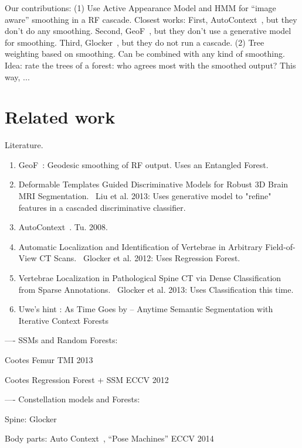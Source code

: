 \documentclass[10pt,twocolumn,letterpaper]{article}
\begin{document}
Our contributions: 
%
(1) Use Active Appearance Model and HMM for "`image aware"' smoothing in a RF cascade. 
Closest works: 
First, AutoContext~\cite{AutoContext2008}, but they don't do any smoothing. 
Second, GeoF~\cite{GeoForests2013}, but they don't use a generative model for smoothing. 
Third, Glocker~\cite{Glocker2013}, but they do not run a cascade. 
%
(2) Tree weighting based on smoothing. Can be combined with any kind of smoothing. Idea: rate the trees of a forest: who agrees most with the smoothed output? This way, ...
%

\section{Related work}

Literature.
\begin{enumerate}
\item GeoF~\cite{GeoForests2013}: Geodesic smoothing of RF output.  Uses an Entangled Forest.
\item Deformable Templates Guided Discriminative Models for Robust 3D Brain MRI Segmentation.~\cite{BrainSeg2013}  Liu et al.  2013: Uses generative model to "refine" features in a cascaded discriminative classifier.
\item AutoContext~\cite{AutoContext2008}.  Tu.  2008.
\item Automatic Localization and Identification of Vertebrae in Arbitrary Field-of-View CT Scans.~\cite{Glocker2012} Glocker et al.  2012: Uses Regression Forest.
\item Vertebrae Localization in Pathological Spine CT via Dense Classification from Sparse Annotations.~\cite{Glocker2013} Glocker et al.  2013: Uses Classification this time.
\item Uwe's hint \cite{Denzler2012}: As Time Goes by -- Anytime Semantic Segmentation with Iterative Context Forests
\end{enumerate}

---- SSMs and Random Forests:

Cootes Femur TMI 2013~\cite{CootesFemurTMI2013}

Cootes Regression Forest + SSM ECCV 2012~\cite{CootesECCV2012RRFandSSM}

---- Constellation models and Forests:

Spine: Glocker~\cite{Glocker2013}

Body parts: Auto Context~\cite{AutoContext2008}, "`Pose Machines"' ECCV 2014~\cite{PoseMachinesECCV2014}
\end{document}
